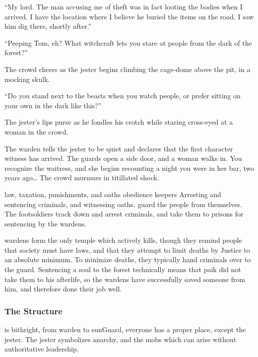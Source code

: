\begin{multicols}{2}
{    ``My lord.
    The man accusing me of theft was in fact looting the bodies when I arrived.
    I have the location where I believe he buried the items on the road.
    I saw him dig there, shortly after.''

    {\sffamily ``Peeping Tom, eh?
    What \gls{witchcraft} lets you stare at people from the dark of the forest?''}

    The crowd cheers as the jester begins climbing the cage-dome above the pit, in a mocking skulk.

    {\sffamily ``Do you stand next to the beasts when you watch people, or prefer sitting on your own in the dark like this?''}

    The jester's lips purse as he fondles his crotch while staring cross-eyed at a woman in the crowd.

    The \gls{warden} tells the jester to be quiet and declares that the first character witness has arrived.
    The guards open a side door, and a woman walks in.
    You recognize the waitress, and she begins recounting a night you were in her bar, two years ago\ldots
    The crowd murmurs in titillated shock.
  }%
  {law, taxation, punishments, and oaths}%
  {obedience}%
  {\Glspl{keeper}}%
  {
    Arresting and sentencing criminals, and witnessing oaths.
  }%
guard the people from themselves.
The footsoldiers track down and arrest criminals, and take them to prisons for sentencing by the \glspl{warden}.

\Glspl{warden} form the only temple which actively kills, though they remind people that society must have laws, and that they attempt to limit deaths by Justice to an absolute minimum.
To minimize deaths, they typically hand criminals over to the \gls{guard}.
Sentencing a soul to the forest technically means that \gls{paik} did not take them to his afterlife, so the \glspl{warden} have successfully saved someone from him, and therefore done their job well.

\subsubsection{The Structure}
is bithright, from \gls{warden} to \gls{sunGuard}, everyone has a proper place, except the jester.
The jester symbolizes anarchy, and the mobs which can arise without authoritative leadership.


\end{multicols}
